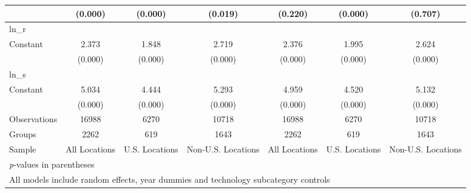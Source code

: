 \begin{table}[htbp]
\begin{tabular}{l*{6}{c}}
                &  (0.000)&  (0.000)&  (0.019)&  (0.220)&  (0.000)&  (0.707)\\
\hline
ln\_r            &         &         &         &         &         &         \\
Constant        &    2.373&    1.848&    2.719&    2.376&    1.995&    2.624\\
                &  (0.000)&  (0.000)&  (0.000)&  (0.000)&  (0.000)&  (0.000)\\
\hline
ln\_s            &         &         &         &         &         &         \\
Constant        &    5.034&    4.444&    5.293&    4.959&    4.520&    5.132\\
                &  (0.000)&  (0.000)&  (0.000)&  (0.000)&  (0.000)&  (0.000)\\
\hline
Observations    &    16988&     6270&    10718&    16988&     6270&    10718\\
Groups          &     2262&      619&     1643&     2262&      619&     1643\\
Sample          &All Locations&U.S. Locations&Non-U.S. Locations&All Locations&U.S. Locations&Non-U.S. Locations\\
\hline\hline
\multicolumn{7}{l}{\footnotesize \textit{p}-values in parentheses}\\
\multicolumn{7}{l}{\footnotesize All models include random effects, year dummies and technology subcategory controls}\\
\end{tabular}
\end{table}
